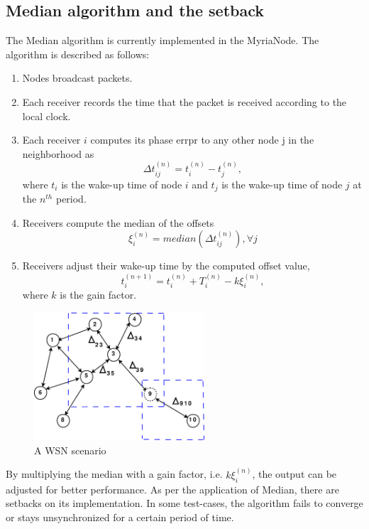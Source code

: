 \documentclass[journal]{IEEEtran}
\begin{document}
\subsection{\textbf{Median algorithm and the setback}}
The Median algorithm is currently implemented in the MyriaNode.
The algorithm is described as follows:
\begin{enumerate}
\item Nodes broadcast packets.
\item Each receiver records the time that the packet is received according to the local clock.
\item Each receiver $i$ computes its phase errpr to
any other node j in the neighborhood as
\begin{equation}
\Delta t_{ij}^{(n)} = t_i^{(n)} - t_j^{(n)} ,
\end{equation}
where $t_i$ is the wake-up time of node $i$ and $t_j$ is the wake-up
time of node $j$ at the $n^{th}$ period.
\item Receivers compute the median of the offsets
\begin{equation}
\xi_i^{(n)} = median(\Delta t_{ij}^{(n)}) , \forall j
\end{equation}
\item Receivers adjust their wake-up time by the computed offset value,
\begin{equation}
t_{i}^{(n+1)} = t_i^{(n)} + T_i^{(n)} - k\xi_i^{(n)},
\end{equation}
where $k$ is the gain factor.
\end{enumerate}
\begin{figure}[b]
\centering
\includegraphics[width=2.5in]{node_field}
\caption{A WSN scenario} \label{wsn}
\end{figure}
By multiplying the median with a gain factor,
i.e. $k\xi_i^{(n)}$, the output can be adjusted for better
performance.
\newline As per the application of Median, there are setbacks on its implementation. In some test-cases, the algorithm fails to converge or stays unsynchronized for a certain period of time.
\end{document}
